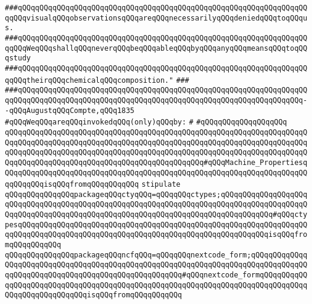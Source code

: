 \verb|###qQQqqQQqqQQqqQQqqQQqqQQqqQQqqQQqqQQqqQQqqQQqqQQqqQQqqQQqqQQqqQQqqQQqqQQqvisualqQQqobservationsqQQqareqQQqnecessarilyqQQqdeniedqQQqtoqQQqus.|\newline
\verb|###qQQqqQQqqQQqqQQqqQQqqQQqqQQqqQQqqQQqqQQqqQQqqQQqqQQqqQQqqQQqqQQqqQQqqQQqWeqQQqshallqQQqneverqQQqbeqQQqableqQQqbyqQQqanyqQQqmeansqQQqtoqQQqstudy|\newline
\verb|###qQQqqQQqqQQqqQQqqQQqqQQqqQQqqQQqqQQqqQQqqQQqqQQqqQQqqQQqqQQqqQQqqQQqqQQqtheirqQQqchemicalqQQqcomposition."|\newline
\verb|###|\newline
\verb|###qQQqqQQqqQQqqQQqqQQqqQQqqQQqqQQqqQQqqQQqqQQqqQQqqQQqqQQqqQQqqQQqqQQqqQQqqQQqqQQqqQQqqQQqqQQqqQQqqQQqqQQqqQQqqQQqqQQqqQQqqQQqqQQqqQQqqQQq--qQQqAugustqQQqCompte,qQQq1835|\newline
\newline
\newline
\verb|#qQQqWeqQQqareqQQqinvokedqQQq(only)qQQqby:|\newline
\verb|#|\newline
\verb|#qQQqqQQqqQQqqQQqqQQq|\newline
\newline
\verb|qQQqqQQqqQQqqQQqqQQqqQQqqQQqqQQqqQQqqQQqqQQqqQQqqQQqqQQqqQQqqQQqqQQqqQQqqQQqqQQqqQQqqQQqqQQqqQQqqQQqqQQqqQQqqQQqqQQqqQQqqQQqqQQqqQQqqQQqqQQqqQQqqQQqqQQqqQQqqQQqqQQqqQQqqQQqqQQqqQQqqQQqqQQqqQQqqQQqqQQqqQQqqQQqqQQqqQQqqQQqqQQqqQQqqQQqqQQqqQQqqQQqqQQqqQQqqQQq#qQQqMachine_PropertiesqQQqqQQqqQQqqQQqqQQqqQQqqQQqqQQqqQQqqQQqqQQqqQQqqQQqqQQqqQQqqQQqqQQqqQQqqQQqqQQqisqQQqfromqQQqqQQqqQQq|\newline
\verb|stipulate|\newline
\verb|qQQqqQQqqQQqqQQqpackageqQQqctyqQQq=qQQqqQQqctypes;qQQqqQQqqQQqqQQqqQQqqQQqqQQqqQQqqQQqqQQqqQQqqQQqqQQqqQQqqQQqqQQqqQQqqQQqqQQqqQQqqQQqqQQqqQQqqQQqqQQqqQQqqQQqqQQqqQQqqQQqqQQqqQQqqQQqqQQqqQQqqQQqqQQqqQQq#qQQqctypesqQQqqQQqqQQqqQQqqQQqqQQqqQQqqQQqqQQqqQQqqQQqqQQqqQQqqQQqqQQqqQQqqQQqqQQqqQQqqQQqqQQqqQQqqQQqqQQqqQQqqQQqqQQqqQQqqQQqqQQqqQQqqQQqisqQQqfromqQQqqQQqqQQq|\newline
\verb|qQQqqQQqqQQqqQQqpackageqQQqncfqQQq=qQQqqQQqnextcode_form;qQQqqQQqqQQqqQQqqQQqqQQqqQQqqQQqqQQqqQQqqQQqqQQqqQQqqQQqqQQqqQQqqQQqqQQqqQQqqQQqqQQqqQQqqQQqqQQqqQQqqQQqqQQqqQQqqQQqqQQqqQQq#qQQqnextcode_formqQQqqQQqqQQqqQQqqQQqqQQqqQQqqQQqqQQqqQQqqQQqqQQqqQQqqQQqqQQqqQQqqQQqqQQqqQQqqQQqqQQqqQQqqQQqqQQqqQQqisqQQqfromqQQqqQQqqQQq|\newline
